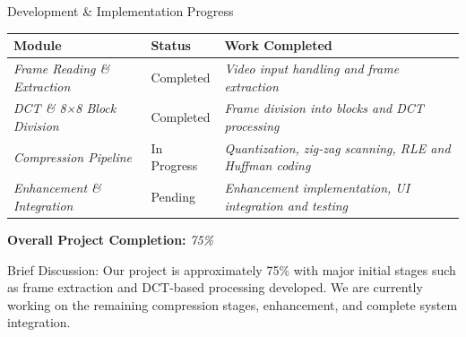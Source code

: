 \documentclass[aspectratio=169,11pt]{beamer}
\newcommand{\smallnote}[1]{%
\vspace{0.08cm}
{\scriptsize\color{GEUGrey}#1}
}
\newcommand{\placeholder}[1]{%
\textit{\color{GEUGrey}#1}
}
\begin{document}
\begin{frame}{Development \& Implementation Progress}

\scriptsize

\begin{center}

\renewcommand{\arraystretch}{1.05}

\begin{tabularx}{.96\textwidth}
{@{}p{3cm}p{2.2cm}X@{}}

\toprule
\textbf{Module} &
\textbf{Status} &
\textbf{Work Completed}\\
\midrule

\placeholder{Frame Reading \& Extraction} &
Completed &
\placeholder{Video input handling and frame extraction}\\

\placeholder{DCT \&  8×8 Block Division} &
Completed &
\placeholder{Frame division into blocks and DCT processing}\\

\placeholder{Compression Pipeline} &
In Progress &
\placeholder{Quantization, zig-zag scanning, RLE and Huffman coding}\\

\placeholder{Enhancement  \& Integration} &
Pending &
\placeholder{Enhancement implementation, UI integration and testing}\\

\bottomrule

\end{tabularx}

\end{center}

\vspace{3mm}

\begin{center}
\colorbox{GEULightBlue}{
\parbox{.65\textwidth}{
\centering
\textbf{Overall Project Completion:}
\placeholder{75\%}
}}
\end{center}

\smallnote{
Brief Discussion: Our project is approximately 75\% with major initial stages such as frame extraction and DCT-based processing developed. We are currently working on the remaining compression stages, enhancement, and complete system integration.
}

\end{frame}
\end{document}
